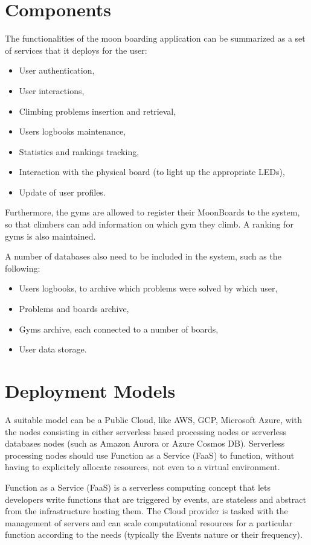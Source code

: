 \documentclass{article}
\begin{document}
\section{Components}\label{sec:components}
The functionalities of the moon boarding application can be summarized as a set of services that it deploys for the user:
\begin{itemize}
    \item User authentication,
    \item User interactions,
    \item Climbing problems insertion and retrieval,
    \item Users logbooks maintenance,
    \item Statistics and rankings tracking,
    \item Interaction with the physical board (to light up the appropriate LEDs),
    \item Update of user profiles.
\end{itemize}

Furthermore, the gyms are allowed to register their MoonBoards to the system, so that climbers can add information on which gym they climb. 
A ranking for gyms is also maintained.

A number of databases also need to be included in the system, such as the following:
\begin{itemize}
    \item Users logbooks, to archive which problems were solved by which user,
    \item Problems and boards archive,
    \item Gyms archive, each connected to a number of boards,
    \item User data storage.
\end{itemize}

\section{Deployment Models}\label{sec:models}

A suitable model can be a Public Cloud, like AWS, GCP, Microsoft Azure, with the nodes consisting in either serverless based processing nodes or serverless databases nodes (such as Amazon Aurora or Azure Cosmos DB). 
Serverless processing nodes should use Function as a Service (FaaS) to function, without having to explicitely allocate resources, not even to a virtual environment.

Function as a Service (FaaS) is a serverless computing concept that lets developers write functions that are triggered by events, are stateless and abstract from the infrastructure hosting them. The Cloud provider is tasked with the management of servers and can scale computational resources for a particular function according to the needs (typically the Events nature or their frequency).
\end{document}
